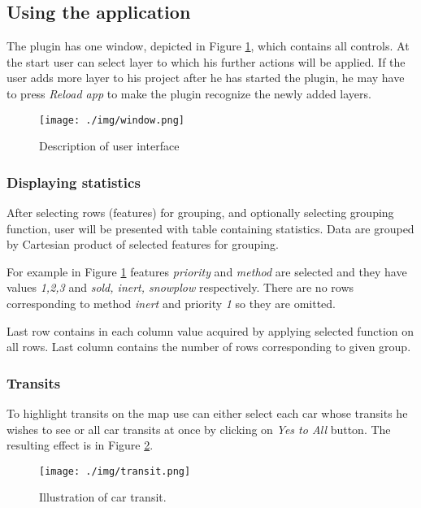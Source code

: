 \documentclass[12pt,a4paper]{article}
\begin{document}
\subsection{Using the application}
The plugin has one window, depicted in Figure \ref{window}, which contains all controls.
At the start user can select layer to which his further actions will be applied.
If the user adds more layer to his project after he has started the plugin, he may have to press \emph{Reload app} to make the plugin recognize the newly added layers.

\begin{figure}[H]\centering
\texttt{[image: ./img/window.png]}
\caption{Description of user interface}
\label{window}
\end{figure}

\subsubsection{Displaying statistics}
After selecting rows (features) for grouping, and optionally selecting grouping function, user will be presented with table containing statistics.
Data are grouped by Cartesian product of selected features for grouping. 

\par For example in Figure \ref{window} features \emph{priority} and \emph{method} are selected and they have values \emph{1,2,3} and \emph{sold, inert, snowplow} respectively.
There are no rows corresponding to method \emph{inert} and priority \emph{1} so they are omitted.

\par Last row contains in each column value acquired by applying selected function on all rows.
Last column contains the number of rows corresponding to given group.

\subsubsection{Transits}
To highlight transits on the map use can either select each car whose transits he wishes to see or all car transits at once by clicking on \emph{Yes to All} button.
The resulting effect is in Figure \ref{transit}.

\begin{figure}[H]\centering
\texttt{[image: ./img/transit.png]}
\caption{Illustration of car transit.}
\label{transit}
\end{figure}
\end{document}

